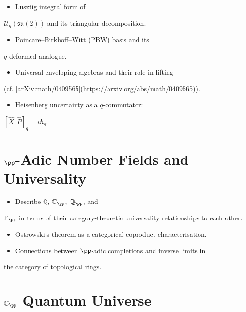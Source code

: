 \begin{itemize}
  \item Lusztig integral form of
\end{itemize}
  $\mathcal{U}_q(\mathfrak{su}(2))$ and its triangular decomposition.
\begin{itemize}
  \item Poincare--Birkhoff--Witt (PBW) basis and its
\end{itemize}
  $q$-deformed analogue.
\begin{itemize}
  \item Universal enveloping algebras and their role in lifting
\end{itemize}
  (cf. [arXiv:math/0409565](https://arxiv.org/abs/math/0409565)).
\begin{itemize}
  \item Heisenberg uncertainty as a $q$-commutator:
\end{itemize}
  $[\hat{X},\hat{P}]_q = i\hbar_q$.

\section{$\pp$-Adic Number Fields and Universality}
\label{sec:p-adic-fields}

\begin{itemize}
  \item Describe $\mathbb{Q}$, $\mathbb{C}_\pp$, $\mathbb{Q}_\pp$, and
\end{itemize}
  $\mathbb{F}_\pp$ in terms of their category-theoretic universality
  relationships to each other.
\begin{itemize}
  \item Ostrowski's theorem as a categorical coproduct characterisation.
  \item Connections between $\pp$-adic completions and inverse limits in
\end{itemize}
  the category of topological rings.

\section{$\mathbb{C}_\pp$ Quantum Universe}
\label{sec:cp-que}

